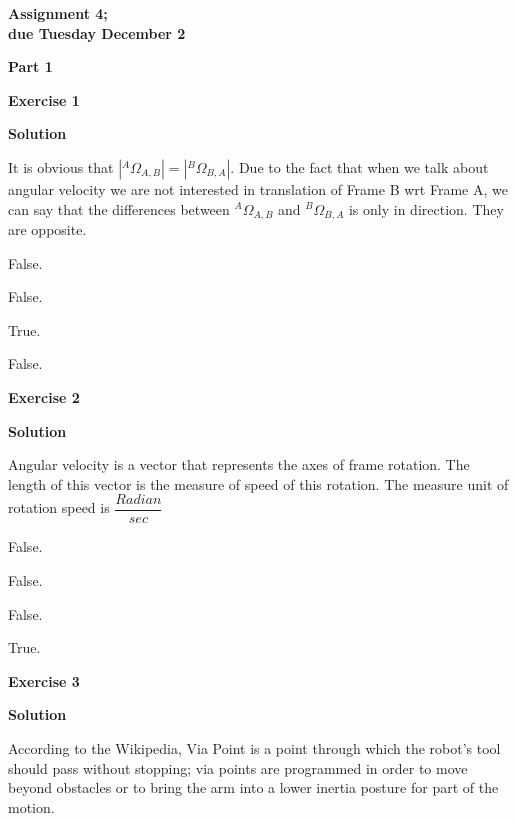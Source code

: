 \documentclass[12pt]{article}
\begin{document}


\begin{center}
\textbf{Assignment 4;\\
due Tuesday December 2}
\end{center}

\textbf{Part 1}	

\bigskip
	
\textbf{Exercise 1}		
		
\textbf{Solution}

\medskip


It is obvious that $|^A\Omega_{A, B}| = |^B\Omega_{B, A}| $.
Due to the fact that when we talk about angular velocity we are not interested in translation of Frame B wrt Frame A, we can say that the differences between $^A\Omega_{A, B}$ and $^B\Omega_{B, A}$ is only in direction. They are opposite.

\begin{list}{()~}{}
\item False.
\item False. 
\item True.
\item False.
\end{list}

\textbf{Exercise 2}		
		
\textbf{Solution}

\medskip

Angular velocity is a vector that represents the axes of frame rotation. The length of this vector is the measure of speed of this rotation. The measure unit of rotation speed is $\dfrac{Radian}{sec}$

\begin{list}{()~}{}
\item False.
\item False. 
\item False.
\item True.
\end{list}

\textbf{Exercise 3}		
		
\textbf{Solution}

\medskip

According to the Wikipedia, Via Point is a point through which the robot's tool should pass without stopping; via points are programmed in order to move beyond obstacles or to bring the arm into a lower inertia posture for part of the motion. 
\end{document}
